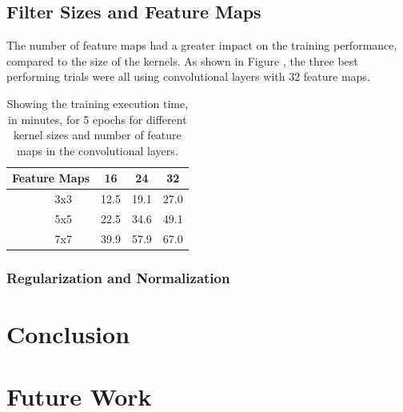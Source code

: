 \documentclass[]{article}
\newcommand*\rot{\rotatebox{90}}
\begin{document}
\subsection{Filter Sizes and Feature Maps}

The number of feature maps had a greater impact on the training performance, compared to the size of the kernels. As shown in Figure , the three best performing trials were all using convolutional layers with 32 feature maps. 

\begin{table}[h]
	\centering
	\caption{Showing the training execution time, in minutes, for 5 epochs for different kernel sizes and number of feature maps in the convolutional layers.}
	\label{filter-res}
	\begin{tabular}{@{}ccccc@{}}
		\toprule
		\multicolumn{2}{c}{Feature Maps} & 16 & 24 & 32 \\ \midrule
		\multirow{3}{*}{\rot{Size}} & \multicolumn{1}{c|}{3x3} & 12.5 & 19.1 & 27.0 \\
		& \multicolumn{1}{c|}{5x5} & 22.5 & 34.6 & 49.1 \\
		& \multicolumn{1}{c|}{7x7} & 39.9 & 57.9 & 67.0 \\ \bottomrule
	\end{tabular}
\end{table}



\subsubsection{Regularization and Normalization}

\section{Conclusion}

\section{Future Work}


\clearpage
\medskip


\end{document}
